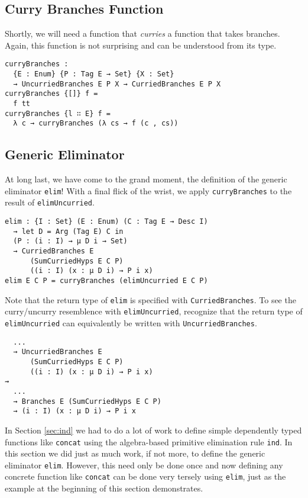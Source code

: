 \documentclass[preprint,nonatbib]{sigplanconf}
\newcommand{\refsec}[1]{Section \ref{sec:#1}}
\begin{document}
\subsection{Curry Branches Function}

Shortly, we will need a function that {\it curries} a function that
takes branches. Again, this function is not surprising and can be
understood from its type.

\begin{verbatim}
curryBranches :
  {E : Enum} {P : Tag E → Set} {X : Set}
  → UncurriedBranches E P X → CurriedBranches E P X
curryBranches {[]} f =
  f tt
curryBranches {l ∷ E} f =
  λ c → curryBranches (λ cs → f (c , cs))
\end{verbatim}

\subsection{Generic Eliminator}

At long last, we have come to the grand moment, the definition of the
generic eliminator {\tt elim}! With a final flick of the wrist, we
apply {\tt curryBranches} to the result of {\tt elimUncurried}.

\begin{verbatim}
elim : {I : Set} (E : Enum) (C : Tag E → Desc I)
  → let D = Arg (Tag E) C in
  (P : (i : I) → μ D i → Set)
  → CurriedBranches E
      (SumCurriedHyps E C P)
      ((i : I) (x : μ D i) → P i x)
elim E C P = curryBranches (elimUncurried E C P)
\end{verbatim}

Note that the return type of {\tt elim} is specified with
\linebreak
{\tt CurriedBranches}. To see the curry/uncurry resemblence with
{\tt elimUncurried}, recognize that the return type of
{\tt elimUncurried} can equivalently be written with
{\tt UncurriedBranches}.

\begin{verbatim}
  ...
  → UncurriedBranches E
      (SumCurriedHyps E C P)
      ((i : I) (x : μ D i) → P i x)
⇝
  ...
  → Branches E (SumCurriedHyps E C P)
  → (i : I) (x : μ D i) → P i x
\end{verbatim}

In \refsec{ind} we had to do a lot of work to define simple dependently
typed functions like {\tt concat} using the algebra-based primitive
elimination rule {\tt ind}. In this section we did just as much work,
if not more, to define the generic eliminator {\tt elim}. However,
this need only be done once and now defining any concrete function
like {\tt concat} can be done very tersely using {\tt elim}, just as
the example at the beginning of this section demonstrates.
\end{document}
